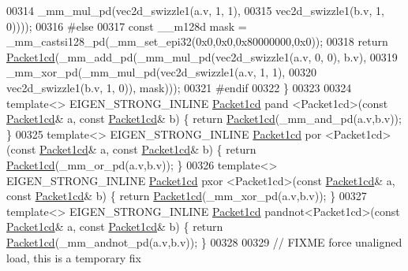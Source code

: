 \begin{DoxyCode}
00314                                  \_mm\_mul\_pd(vec2d\_swizzle1(a.v, 1, 1),
00315                                             vec2d\_swizzle1(b.v, 1, 0))));
00316 \textcolor{preprocessor}{  #else}
00317   \textcolor{keyword}{const} \_\_m128d mask = \_mm\_castsi128\_pd(\_mm\_set\_epi32(0x0,0x0,0x80000000,0x0));
00318   \textcolor{keywordflow}{return} \hyperlink{struct_eigen_1_1internal_1_1_packet1cd}{Packet1cd}(\_mm\_add\_pd(\_mm\_mul\_pd(vec2d\_swizzle1(a.v, 0, 0), b.v),
00319                               \_mm\_xor\_pd(\_mm\_mul\_pd(vec2d\_swizzle1(a.v, 1, 1),
00320                                                     vec2d\_swizzle1(b.v, 1, 0)), mask)));
00321 \textcolor{preprocessor}{  #endif}
00322 \}
00323 
00324 \textcolor{keyword}{template}<> EIGEN\_STRONG\_INLINE \hyperlink{struct_eigen_1_1internal_1_1_packet1cd}{Packet1cd} pand   <Packet1cd>(\textcolor{keyword}{const} 
      \hyperlink{struct_eigen_1_1internal_1_1_packet1cd}{Packet1cd}& a, \textcolor{keyword}{const} \hyperlink{struct_eigen_1_1internal_1_1_packet1cd}{Packet1cd}& b) \{ \textcolor{keywordflow}{return} \hyperlink{struct_eigen_1_1internal_1_1_packet1cd}{Packet1cd}(\_mm\_and\_pd(a.v,b.v)); \}
00325 \textcolor{keyword}{template}<> EIGEN\_STRONG\_INLINE \hyperlink{struct_eigen_1_1internal_1_1_packet1cd}{Packet1cd} por    <Packet1cd>(\textcolor{keyword}{const} 
      \hyperlink{struct_eigen_1_1internal_1_1_packet1cd}{Packet1cd}& a, \textcolor{keyword}{const} \hyperlink{struct_eigen_1_1internal_1_1_packet1cd}{Packet1cd}& b) \{ \textcolor{keywordflow}{return} \hyperlink{struct_eigen_1_1internal_1_1_packet1cd}{Packet1cd}(\_mm\_or\_pd(a.v,b.v)); \}
00326 \textcolor{keyword}{template}<> EIGEN\_STRONG\_INLINE \hyperlink{struct_eigen_1_1internal_1_1_packet1cd}{Packet1cd} pxor   <Packet1cd>(\textcolor{keyword}{const} 
      \hyperlink{struct_eigen_1_1internal_1_1_packet1cd}{Packet1cd}& a, \textcolor{keyword}{const} \hyperlink{struct_eigen_1_1internal_1_1_packet1cd}{Packet1cd}& b) \{ \textcolor{keywordflow}{return} \hyperlink{struct_eigen_1_1internal_1_1_packet1cd}{Packet1cd}(\_mm\_xor\_pd(a.v,b.v)); \}
00327 \textcolor{keyword}{template}<> EIGEN\_STRONG\_INLINE \hyperlink{struct_eigen_1_1internal_1_1_packet1cd}{Packet1cd} pandnot<Packet1cd>(\textcolor{keyword}{const} 
      \hyperlink{struct_eigen_1_1internal_1_1_packet1cd}{Packet1cd}& a, \textcolor{keyword}{const} \hyperlink{struct_eigen_1_1internal_1_1_packet1cd}{Packet1cd}& b) \{ \textcolor{keywordflow}{return} \hyperlink{struct_eigen_1_1internal_1_1_packet1cd}{Packet1cd}(\_mm\_andnot\_pd(a.v,b.v)); \}
00328 
00329 \textcolor{comment}{// FIXME force unaligned load, this is a temporary fix}

\end{DoxyCode}
